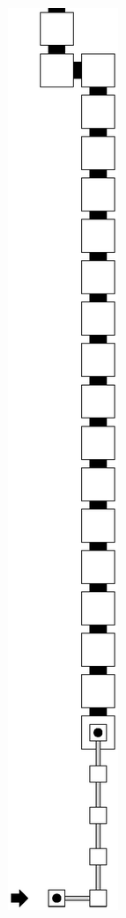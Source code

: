\begin{itemize}
\begin{figure}[H]
            \begin{subfigure}[t]{0.32\textwidth}
                \centering
                \includegraphics[width=0.32\textwidth]{warping_post_warp_case1_digit1_msr}

\end{subfigure}
\end{figure}
\end{itemize}

